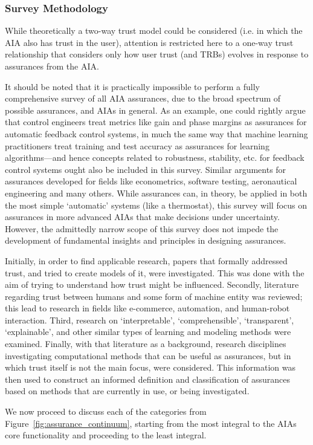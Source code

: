 \subsubsection*{Survey Methodology} \label{sec:methodology}
    While theoretically a two-way trust model could be considered (i.e. in which the AIA also has trust in the user), attention is restricted here to a one-way trust relationship that considers only how user trust (and TRBs) evolves in response to assurances from the AIA. 

    It should be noted that it is practically impossible to perform a fully comprehensive survey of all AIA assurances, due to the broad spectrum of possible assurances, and AIAs in general. As an example, one could rightly argue that control engineers treat metrics like gain and phase margins as assurances for automatic feedback control systems, in much the same way that machine learning practitioners treat training and test accuracy as assurances for learning algorithms---and hence concepts related to robustness, stability, etc. for feedback control systems ought also be included in this survey. Similar arguments for assurances developed for fields like econometrics, software testing, aeronautical engineering and many others. While assurances can, in theory, be applied in both the most simple `automatic' systems (like a thermostat), this survey will focus on assurances in more advanced AIAs that make decisions under uncertainty. However, the admittedly narrow scope of this survey does not impede the development of fundamental insights and principles in designing assurances.

    Initially, in order to find applicable research, papers that formally addressed trust, and tried to create models of it, were investigated. This was done with the aim of trying to understand how trust might be influenced. Secondly, literature regarding trust between humans and some form of machine entity was reviewed; this lead to research in fields like e-commerce, automation, and human-robot interaction. Third, research on `interpretable', `comprehensible', `transparent', `explainable', and other similar types of learning and modeling methods were examined. Finally, with that literature as a background, research disciplines investigating computational methods that can be useful as assurances, but in which trust itself is not the main focus, were considered. This information was then used to construct an informed definition and classification of assurances based on methods that are currently in use, or being investigated.
    
    We now proceed to discuss each of the categories from Figure~\ref{fig:assurance_continuum}, starting from the most integral to the AIAs core functionality and proceeding to the least integral.
